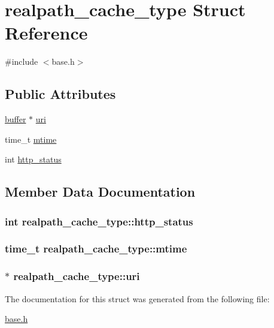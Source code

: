 \hypertarget{structrealpath__cache__type}{\section{realpath\-\_\-cache\-\_\-type Struct Reference}
\label{structrealpath__cache__type}
}


{\ttfamily \#include $<$base.\-h$>$}

\subsection*{Public Attributes}
\begin{DoxyCompactItemize}
\item 
\hyperlink{structbuffer}{buffer} $\ast$ \hyperlink{structrealpath__cache__type_a80c087f9fc9d4c702eda66f6243ca6ac}{uri}
\item 
time\-\_\-t \hyperlink{structrealpath__cache__type_ae725434c78d9ee999898766f9416e959}{mtime}
\item 
int \hyperlink{structrealpath__cache__type_a8d6d11401737ea74597cbcfaedc024ff}{http\-\_\-status}
\end{DoxyCompactItemize}


\subsection{Member Data Documentation}
\hypertarget{structrealpath__cache__type_a8d6d11401737ea74597cbcfaedc024ff}{
\subsubsection[{http\-\_\-status}]{\setlength{\rightskip}{0pt plus 5cm}int realpath\-\_\-cache\-\_\-type\-::http\-\_\-status}}\label{structrealpath__cache__type_a8d6d11401737ea74597cbcfaedc024ff}
\hypertarget{structrealpath__cache__type_ae725434c78d9ee999898766f9416e959}{
\subsubsection[{mtime}]{\setlength{\rightskip}{0pt plus 5cm}time\-\_\-t realpath\-\_\-cache\-\_\-type\-::mtime}}\label{structrealpath__cache__type_ae725434c78d9ee999898766f9416e959}
\hypertarget{structrealpath__cache__type_a80c087f9fc9d4c702eda66f6243ca6ac}{
\subsubsection[{uri}]{$\ast$ realpath\-\_\-cache\-\_\-type\-::uri}}\label{structrealpath__cache__type_a80c087f9fc9d4c702eda66f6243ca6ac}


The documentation for this struct was generated from the following file\-:\begin{DoxyCompactItemize}
\item 
\hyperlink{base_8h}{base.\-h}\end{DoxyCompactItemize}
